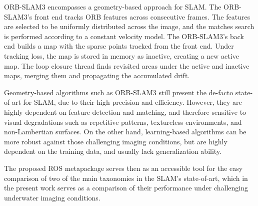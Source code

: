 ORB-SLAM3 encompasses a geometry-based approach for SLAM. The ORB-SLAM3's front end tracks ORB features across consecutive frames. The features are selected to be uniformly distributed across the image, and the matches search is performed according to a constant velocity model. The ORB-SLAM3's back end builds a map with the sparse points tracked from the front end. Under tracking loss, the map is stored in memory as inactive, creating a new active map. The loop closure thread finds revisited areas under the active and inactive maps, merging them and propagating the accumulated drift. %

Geometry-based algorithms such as ORB-SLAM3 still present the de-facto state-of-art for SLAM, due to their high precision and efficiency. However, they are highly dependent on feature detection and matching, and therefore sensitive to visual degradations such as repetitive patterns, textureless environments, and non-Lambertian surfaces. On the other hand, learning-based algorithms can be more robust against those challenging imaging conditions, but are highly dependent on the training data, and usually lack generalization ability.

The proposed ROS metapackage serves then as an accessible tool for the easy comparison of two of the main taxonomies in the SLAM's state-of-art, which in the present work serves as a comparison of their performance under challenging underwater imaging conditions.


